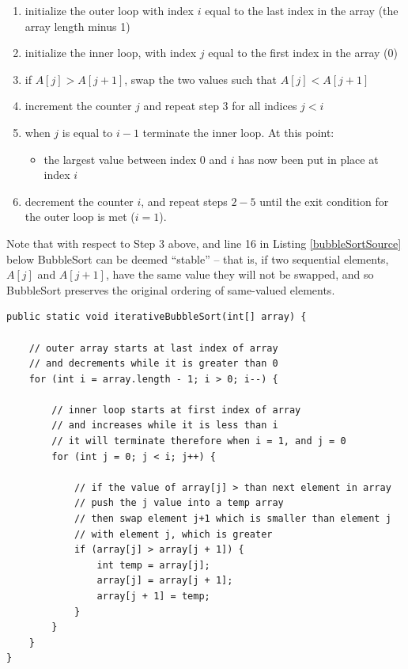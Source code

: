\documentclass[12pt,a4paper]{article}
\begin{document}
\begin{enumerate}
	\item initialize the outer loop with index $i$ equal to the last index in the array (the array length minus 1)
	\item initialize the inner loop, with index $j$ equal to the first index in the array (0)
	\item if $A[j] > A[j+1]$, swap the two values such that $A[j] < A[j+1]$
	\item increment the counter $j$ and repeat step 3 for all indices $j < i$
	\item when $j$ is equal to $i-1$ terminate the inner loop. At this point:
	\begin{itemize}
		\item the largest value between index 0 and $i$ has now been put in place at index $i$
	\end{itemize}
	\item decrement the counter $i$, and repeat steps $2-5$ until the exit condition for the outer loop is met ($i =  1$).
\end{enumerate}

Note that with respect to Step 3 above, and line 16 in Listing \ref{bubbleSortSource} below BubbleSort can be deemed ``stable'' -- that is, if two sequential elements, $A[j]$ and $A[j+1]$, have the same value they will not be swapped, and so BubbleSort preserves the original ordering of same-valued elements.

\clearpage



\begin{lstlisting}[caption={Implementation of a basic Bubblesort algorithm in Java \cite{mannionBubbleSort}. Note that there is no logic to terminate the sort procedure for an array that is already sorted.},captionpos=b, label={bubbleSortSource}]
public static void iterativeBubbleSort(int[] array) {

	// outer array starts at last index of array
	// and decrements while it is greater than 0
	for (int i = array.length - 1; i > 0; i--) {

		// inner loop starts at first index of array
		// and increases while it is less than i
		// it will terminate therefore when i = 1, and j = 0
		for (int j = 0; j < i; j++) {
		
			// if the value of array[j] > than next element in array
			// push the j value into a temp array
			// then swap element j+1 which is smaller than element j
			// with element j, which is greater
			if (array[j] > array[j + 1]) {
				int temp = array[j];
				array[j] = array[j + 1];
				array[j + 1] = temp;
			}
		}
	}
}
\end{lstlisting}
\end{document}
